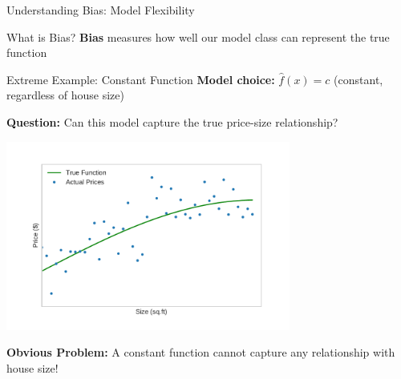 \documentclass[10pt]{beamer}
\newcommand{\fitpic}[1]{\begin{adjustbox}{max width=\linewidth, max totalheight=0.78\textheight}#1\end{adjustbox}}
\begin{document}
\begin{frame}{Understanding Bias: Model Flexibility}
\begin{definitionbox}{What is Bias?}
\textbf{Bias} measures how well our model class can represent the true function
\end{definitionbox}

\begin{examplebox}{Extreme Example: Constant Function}
\textbf{Model choice:} $\hat{f}(x) = c$ (constant, regardless of house size)

\textbf{Question:} Can this model capture the true price-size relationship?
\end{examplebox}

\begin{center}
\fitpic{\includegraphics[width=0.7\textwidth]{../assets/bias-variance/figures/biasn_1.pdf}}
\end{center}

\begin{alertbox}
\textbf{Obvious Problem:} A constant function cannot capture any relationship with house size!
\end{alertbox}
\end{frame}
\end{document}
